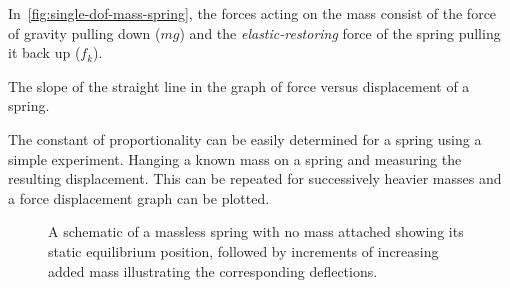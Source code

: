     In~\cref{fig:single-dof-mass-spring}, the forces acting on the mass consist of the force of gravity pulling down ($mg$) and the \textit{elastic-restoring} force of the spring pulling it back up ($f_k$).

    \begin{fmd-definition}
      The slope of the straight line in the graph of force versus displacement of a spring.
    \end{fmd-definition}

    The constant of proportionality can be easily determined for a spring using a simple experiment. Hanging a known mass on a spring and measuring the resulting displacement. This can be repeated for successively heavier masses and a force displacement graph can be plotted.

    \begin{figure}
      \caption{A schematic of a massless spring with no mass attached showing its static equilibrium position, followed by increments of increasing added mass illustrating the corresponding deflections.}\label{fig:spring-deflection} 
    \end{figure}

